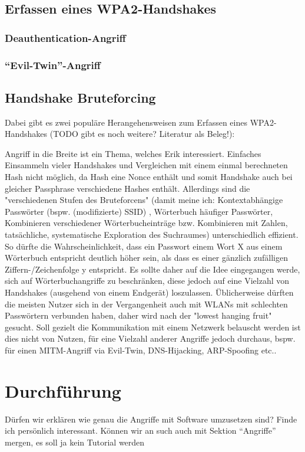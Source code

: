 \documentclass[12pt]{article}
\begin{document}
\subsection{Erfassen eines WPA2-Handshakes}
\subsubsection{Deauthentication-Angriff}
\subsubsection{\enquote{Evil-Twin}-Angriff}

\subsection{Handshake Bruteforcing}
Dabei gibt es zwei populäre Herangehensweisen zum Erfassen eines WPA2-Handshakes (TODO gibt es noch weitere? Literatur als Beleg!): 

Angriff in die Breite ist ein Thema, welches Erik interessiert. Einfaches Einsammeln vieler Handshakes und Vergleichen mit einem einmal berechneten Hash nicht möglich, da Hash eine Nonce enthält und somit Handshake auch bei gleicher Passphrase verschiedene Hashes enthält. Allerdings sind die "verschiedenen Stufen des Bruteforcens" (damit meine ich: Kontextabhängige Passwörter (bspw. (modifizierte) SSID) , Wörterbuch häufiger Passwörter, Kombinieren verschiedener Wörterbucheinträge bzw. Kombinieren mit Zahlen, tatsächliche, systematische Exploration des Suchraumes) unterschiedlich effizient. So dürfte die Wahrscheinlichkeit, dass ein Passwort einem Wort X aus einem Wörterbuch entspricht deutlich höher sein, als dass es einer gänzlich zufälligen Ziffern-/Zeichenfolge y entspricht. Es sollte daher auf die Idee eingegangen werde, sich auf Wörterbuchangriffe zu beschränken, diese jedoch auf eine Vielzahl von Handshakes (ausgehend von einem Endgerät) loszulassen. Üblicherweise dürften die meisten Nutzer sich in der Vergangenheit auch mit WLANs mit schlechten Passwörtern verbunden haben, daher wird nach der "lowest hanging fruit" gesucht. Soll gezielt die Kommunikation mit einem Netzwerk belauscht werden ist dies nicht von Nutzen, für eine Vielzahl anderer Angriffe jedoch durchaus, bspw. für einen MITM-Angriff via Evil-Twin, DNS-Hijacking, ARP-Spoofing etc..

\section{Durchführung}
Dürfen wir erklären wie genau die Angriffe mit Software umzusetzen sind? Finde ich persönlich interessant.
Können wir an such auch mit Sektion \enquote{Angriffe} mergen, es soll ja kein Tutorial werden
\end{document}

